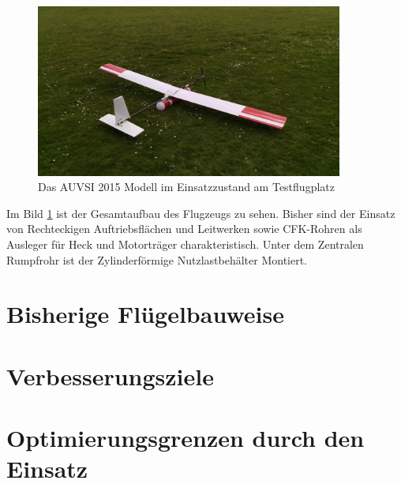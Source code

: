 \begin{figure}[H]
\centering
\includegraphics[width=0.9\textwidth]{bilder/Fotos/AUVSI_2015.jpg} 
\caption{Das AUVSI 2015 Modell im Einsatzzustand am Testflugplatz} 
\label{fig:Das AUVSI 2015 Modell in Einsatzzustand am Testflugplatz}
\end{figure}

Im Bild \ref{fig:Das AUVSI 2015 Modell in Einsatzzustand am Testflugplatz} ist der Gesamtaufbau des Flugzeugs zu sehen. Bisher sind der Einsatz von Rechteckigen Auftriebsflächen und Leitwerken sowie CFK-Rohren als Ausleger für Heck und Motorträger charakteristisch. Unter dem Zentralen Rumpfrohr ist der Zylinderförmige Nutzlastbehälter Montiert.

\section{Bisherige Flügelbauweise}


\section{Verbesserungsziele}

\section{Optimierungsgrenzen durch den Einsatz}